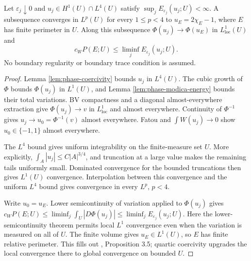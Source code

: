 \begin{theorem}\label{thm:phase-compactness}
Let $\varepsilon_j\downarrow0$ and $u_j\in H^1(U)\cap L^4(U)$ satisfy $\sup_j E_{\varepsilon_j}(u_j;U)<\infty$. A subsequence converges in $L^p(U)$ for every $1\leq p<4$ to $u_E=2\chi_E-1$, where $E$ has finite perimeter in $U$. Along this subsequence $\Phi(u_j)\to\Phi(u_E)$ in $L^1_{\mathrm{loc}}(U)$ and
\[
 c_W P(E;U)\leq\liminf_j E_{\varepsilon_j}(u_j;U).
\]
No boundary regularity or boundary trace condition is assumed.
\end{theorem}
\begin{proof}
Lemma \ref{lem:phase-coercivity} bounds $u_j$ in $L^4(U)$. The cubic growth of $\Phi$ bounds $\Phi(u_j)$ in $L^1(U)$, and Lemma \ref{lem:phase-modica-energy} bounds their total variations. BV compactness and a diagonal almost-everywhere extraction give $\Phi(u_j)\to v$ in $L^1_{\mathrm{loc}}$ and almost everywhere. Continuity of $\Phi^{-1}$ gives $u_j\to u_0=\Phi^{-1}(v)$ almost everywhere. Fatou and $\int W(u_j)\to0$ show $u_0\in\{-1,1\}$ almost everywhere.

The $L^4$ bound gives uniform integrability on the finite-measure set $U$. More explicitly, $\int_A|u_j|\leq C|A|^{3/4}$, and truncation at a large value makes the remaining tails uniformly small. Dominated convergence for the bounded truncations then gives $L^1(U)$ convergence. Interpolation between this convergence and the uniform $L^4$ bound gives convergence in every $L^p$, $p<4$.

Write $u_0=u_E$. Lower semicontinuity of variation applied to $\Phi(u_j)$ gives $c_WP(E;U)\leq\liminf_j\int_U|D\Phi(u_j)|\leq\liminf_jE_{\varepsilon_j}(u_j;U)$. Here the lower-semicontinuity theorem permits local $L^1$ convergence even when the variation is measured on all of $U$. The finite volume gives $u_E\in L^1(U)$, so $E$ has finite relative perimeter. This fills out \cite{ChAC}, Proposition 3.5; quartic coercivity upgrades the local convergence there to global convergence on bounded $U$.
\end{proof}

